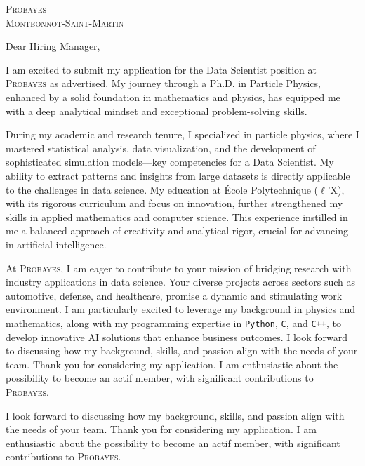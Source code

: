 \documentclass[11pt,a4paper]{lettre}
\begin{document}
\begin{letter} 
{\textsc{Probayes}  \\
\textsc{Montbonnot-Saint-Martin} }
\address{{ Gaya \textsc{Benane} \\ 171 avenue de Luminy \\ 13~009~\textsc{Marseille} }}
\signature{ { Gaya \textsc{Benane} } }
\nofax
\date{\today}
{}
\opening{\hspace{1em} Dear Hiring Manager,}
\hspace{1em}
I am excited to submit my application for the Data Scientist position at \textsc{Probayes} as advertised. My journey through a Ph.D. in Particle Physics, enhanced by a solid foundation in mathematics and physics, has equipped me with a deep analytical mindset and exceptional problem-solving skills.

\hspace{1em}
During my academic and research tenure, I specialized in particle physics, where I mastered statistical analysis, data visualization, and the development of sophisticated simulation models—key competencies for a Data Scientist. My ability to extract patterns and insights from large datasets is directly applicable to the challenges in data science.
My education at École Polytechnique ($\ell$’X), with its rigorous curriculum and focus on innovation, further strengthened my skills in applied mathematics and computer science. This experience instilled in me a balanced approach of creativity and analytical rigor, crucial for advancing in artificial intelligence.

At \textsc{Probayes}, I am eager to contribute to your mission of bridging research with industry applications in data science. Your diverse projects across sectors such as automotive, defense, and healthcare, promise a dynamic and stimulating work environment. I am particularly excited to leverage my background in physics and mathematics, along with my programming expertise in \texttt{Python}, \texttt{C}, and \texttt{C++}, to develop innovative AI solutions that enhance business outcomes.
\hspace{1em}
I look forward to discussing how my background, skills, and passion align with the needs of your team. Thank you for considering my application. I am enthusiastic about the possibility to become an actif member, with significant contributions to \textsc{Probayes}.
\closing{\hspace{1em}
I look forward to discussing how my background, skills, and passion align with the needs of your team. Thank you for considering my application. I am enthusiastic about the possibility to become an actif member, with significant contributions to \textsc{Probayes}.}
\end{letter}
\end{document}
